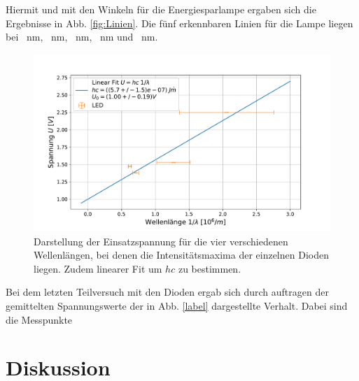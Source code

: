 	Hiermit und mit den Winkeln für die Energiesparlampe ergaben sich die Ergebnisse in Abb. \ref{fig:Linien}.
	Die fünf erkennbaren Linien für die Lampe liegen bei \SI{}{\nano\meter}, \SI{}{\nano\meter}, \SI{}{\nano\meter}, \SI{}{\nano\meter} und \SI{}{\nano\meter}.
	
	\begin{figure}[ht]
		\centering
		\includegraphics[width=\textwidth]{data/Dioden.pdf}
		\caption{Darstellung der Einsatzspannung für die vier verschiedenen Wellenlängen, bei denen die Intensitätsmaxima der einzelnen Dioden liegen. Zudem linearer Fit um $hc$ zu bestimmen.}
		\label{fig:Dioden}	
	\end{figure}
	Bei dem letzten Teilversuch mit den Dioden ergab sich durch auftragen der gemittelten Spannungswerte der in Abb. \ref{label} dargestellte Verhalt. 
	Dabei sind die Messpunkte %
			
\section{Diskussion}
